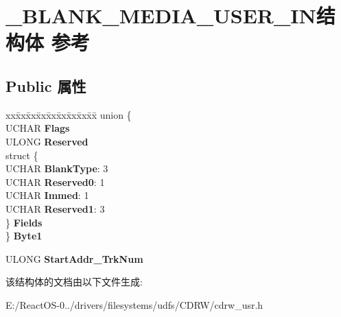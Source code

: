\hypertarget{struct___b_l_a_n_k___m_e_d_i_a___u_s_e_r___i_n}{}\section{\+\_\+\+B\+L\+A\+N\+K\+\_\+\+M\+E\+D\+I\+A\+\_\+\+U\+S\+E\+R\+\_\+\+I\+N结构体 参考}
\label{struct___b_l_a_n_k___m_e_d_i_a___u_s_e_r___i_n}
\subsection*{Public 属性}
\begin{DoxyCompactItemize}
\item 
\mbox{\label{struct___b_l_a_n_k___m_e_d_i_a___u_s_e_r___i_n_ae365ab75f6ee82b68bab896c51ec3977}} 
\begin{tabbing}
xx\=xx\=xx\=xx\=xx\=xx\=xx\=xx\=xx\=\kill
union \{\\
\>UCHAR {\bfseries Flags}\\
\>ULONG {\bfseries Reserved}\\
\>struct \{\\
\>\>UCHAR {\bfseries BlankType}: 3\\
\>\>UCHAR {\bfseries Reserved0}: 1\\
\>\>UCHAR {\bfseries Immed}: 1\\
\>\>UCHAR {\bfseries Reserved1}: 3\\
\>\} {\bfseries Fields}\\
\} {\bfseries Byte1}\\

\end{tabbing}\item 
\mbox{\label{struct___b_l_a_n_k___m_e_d_i_a___u_s_e_r___i_n_a5901efdbaff170aa7a5d70190b0228ac}} 
U\+L\+O\+NG {\bfseries Start\+Addr\+\_\+\+Trk\+Num}
\end{DoxyCompactItemize}


该结构体的文档由以下文件生成\+:\begin{DoxyCompactItemize}
\item 
E\+:/\+React\+O\+S-\/0../drivers/filesystems/udfs/\+C\+D\+R\+W/cdrw\+\_\+usr.\+h\end{DoxyCompactItemize}
